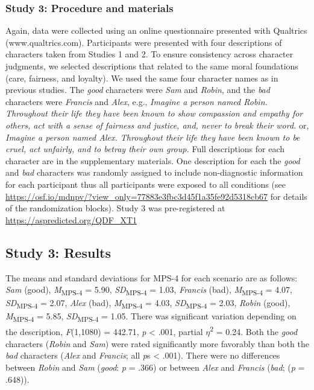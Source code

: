 \documentclass[
  english,
  man,floatsintext]{apa7}
\begin{document}
\hypertarget{study-3-procedure-and-materials}{%
\subsubsection{Study 3: Procedure and materials}\label{study-3-procedure-and-materials}}

Again, data were collected using an online questionnaire presented with Qualtrics (www.qualtrics.com). Participants were presented with four descriptions of characters taken from Studies 1 and 2. To ensure consistency across character judgments, we selected descriptions that related to the same moral foundations (care, fairness, and loyalty). We used the same four character names as in previous studies. The \emph{good} characters were \emph{Sam} and \emph{Robin}, and the \emph{bad} characters were \emph{Francis} and \emph{Alex}, e.g., \emph{Imagine a person named Robin. Throughout their life they have been known to show compassion and empathy for others, act with a sense of fairness and justice, and, never to break their word.} or, \emph{Imagine a person named Alex. Throughout their life they have been known to be cruel, act unfairly, and to betray their own group.} Full descriptions for each character are in the supplementary materials. One description for each the \emph{good} and \emph{bad} characters was randomly assigned to include non-diagnostic information for each participant thus all participants were exposed to all conditions (see \color{blue}\url{https://osf.io/mdnpv/?view_only=77883e3fbc3d45f1a35fe92d5318cb67}\color{black} for details of the randomization blocks). Study 3 was pre-registered at \color{blue}\url{https://aspredicted.org/QDF_XT1}\color{black}

\hypertarget{study-3-results}{%
\subsection{Study 3: Results}\label{study-3-results}}

The means and standard deviations for MPS-4 for each scenario are as follows:
\emph{Sam} (good),
\emph{M}\textsubscript{MPS-4} = 5.90, \emph{SD}\textsubscript{MPS-4} = 1.03,
\emph{Francis} (bad),
\emph{M}\textsubscript{MPS-4} = 4.07, \emph{SD}\textsubscript{MPS-4} = 2.07,
\emph{Alex} (bad),
\emph{M}\textsubscript{MPS-4} = 4.03, \emph{SD}\textsubscript{MPS-4} = 2.03,
\emph{Robin} (good),
\emph{M}\textsubscript{MPS-4} = 5.85, \emph{SD}\textsubscript{MPS-4} = 1.05. There was significant variation depending on the description, \emph{F}(1,1080) = 442.71, \emph{p} \textless{} .001, partial \(\eta\)\textsuperscript{2} = 0.24. Both the \emph{good} characters (\emph{Robin} and \emph{Sam}) were rated significantly more favorably than both the \emph{bad} characters (\emph{Alex} and \emph{Francis}; all \emph{p}s \textless{} .001). There were no differences between \emph{Robin} and \emph{Sam} (\emph{good}: \emph{p} = .366) or between \emph{Alex} and \emph{Francis} (\emph{bad}; (\emph{p} = .648)).
\end{document}
